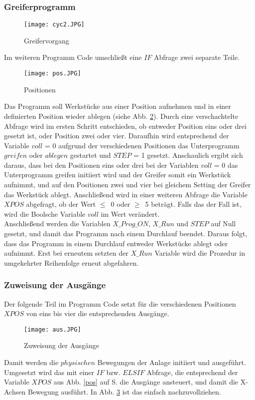\documentclass[12pt,a4paper]{scrartcl}	%
\begin{document}
\subsubsection{Greiferprogramm}
\begin{figure}[h] 
	\vspace{-10pt}
	\centering
	\texttt{[image: cyc2.JPG]}
	\caption[Greifervorgang]{Greifervorgang}
	\label{greif}
\end{figure}
Im weiteren Programm Code umschließt eine $IF$ Abfrage zwei separate Teile.
\begin{figure}[!h]
	\vspace{-10pt}
	\centering
	\texttt{[image: pos.JPG]}
	\caption[Positionen]{Positionen}
	\label{posi}
\end{figure} 
Das Programm soll Werkstücke aus einer Position aufnehmen und in einer definierten Position wieder ablegen (siehe Abb. \ref{posi}). Durch eine verschachtelte Abfrage wird im ersten Schritt entschieden, ob entweder Position eins oder drei gesetzt ist, oder Position zwei oder vier. Daraufhin wird entsprechend der Variable $voll$ = 0 aufgrund der verschiedenen Positionen das Unterprogramm $greifen$ oder $ablegen$ gestartet und $STEP$ = 1 gesetzt. Anschaulich ergibt sich daraus, dass bei den Positionen eins oder drei bei der Variablen $voll$ = 0 das Unterprogramm greifen initiiert wird und der Greifer somit ein Werkstück aufnimmt, und auf den Positionen zwei und vier bei gleichem Setting der Greifer das Werkstück ablegt.
Anschließend wird in einer weiteren Abfrage die Variable $XPOS$ abgefragt, ob der Wert \mbox{$\leq$ 0} oder \mbox{$\geq$ 5} beträgt. Falls das der Fall ist, wird die Boolsche Variable $voll$ im Wert verändert.\\
Anschließend werden die Variablen $X\_Prog\_ON$, $X\_Run$ und $STEP$ auf Null gesetzt, und damit das Programm nach einem Durchlauf beendet. Daraus folgt, dass das Programm in einem Durchlauf entweder Werkstücke ablegt oder aufnimmt. Erst bei erneutem setzten der $X\_Run$ Variable wird die Prozedur in umgekehrter Reihenfolge erneut abgefahren.\\
\subsubsection{Zuweisung der Ausgänge}
Der folgende Teil im Programm Code setzt für die verschiedenen Positionen $XPOS$ von eins bis vier die entsprechenden Ausgänge.
\begin{figure}%
	\vspace{-10pt}
	\centering
	\texttt{[image: aus.JPG]}
	\caption[Zuweisung der Ausgänge]{Zuweisung der Ausgänge}
	\label{aus}
\end{figure}
Damit werden die $physischen$ Bewegungen der Anlage initiiert und ausgeführt. Umgesetzt wird das mit einer $IF$ bzw. $ELSIF$ Abfrage, die entsprechend der Variable $XPOS$ aus Abb. \ref{pos} auf S. \pageref{pos} die Ausgänge ansteuert, und damit die X-Achsen Bewegung ausführt. In Abb. \ref{aus} ist das einfach nachzuvollziehen.\\
\end{document}

